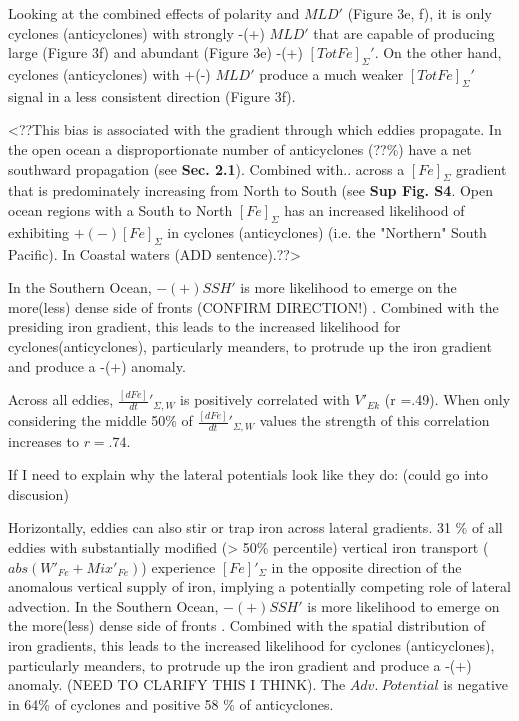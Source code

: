 Looking at the combined effects of polarity and $MLD'$ (Figure 3e, f), it is only cyclones (anticyclones) with strongly -(+) $MLD'$ that are capable of producing large (Figure 3f) and abundant (Figure 3e) -(+) $[TotFe]_\Sigma'$. On the other hand, cyclones (anticyclones) with +(-) $MLD'$ produce a much weaker $[TotFe]_\Sigma'$ signal in a less consistent direction (Figure 3f).

<??This bias is associated with the gradient through which eddies propagate. In the open ocean a disproportionate number of anticyclones (??\%) have a net southward propagation (see \textbf{Sec. 2.1}). Combined with.. across a $[Fe]_\Sigma$ gradient that is predominately increasing from North to South (see \textbf{Sup Fig. S4}. Open ocean regions with a South to North $[Fe]_\Sigma$ has an increased likelihood of exhibiting $+(-)[Fe]_\Sigma$ in cyclones (anticyclones) (i.e. the "Northern" South Pacific).  In Coastal waters (ADD sentence).??>

In the Southern Ocean, $-(+)SSH'$ is more likelihood to emerge on the more(less) dense side of fronts (CONFIRM DIRECTION!) \parencite{SongSeasonalvariationcorrelation2018}.  Combined with the presiding iron gradient, this leads to the increased likelihood for cyclones(anticyclones), particularly meanders, to protrude up the iron gradient and produce a -(+) anomaly. 

 
 
 
Across all eddies, $\frac{[dFe]}{dt}'_{\Sigma, W}$ is positively correlated with $V'_{Ek}$ (r =.49). When only considering the middle 50\% of $\frac{[dFe]}{dt}'_{\Sigma, W}$ values the strength of this correlation increases to $r=.74$. 




If I need to explain why the lateral potentials look like they do:
(could go into discusion)

Horizontally, eddies can also stir or trap iron across lateral gradients. 31 \% of all eddies with substantially modified (> 50\% percentile) vertical iron transport ($abs(W'_{Fe}+Mix'_{Fe})$) experience $[Fe]'_\Sigma$ in the opposite direction of the anomalous vertical supply of iron, implying a potentially competing role of lateral advection. In the Southern Ocean, $-(+)SSH'$ is more likelihood to emerge on the more(less) dense side of fronts \parencite{SongSeasonalvariationcorrelation2018}. Combined with the spatial distribution of iron gradients, this leads to the increased likelihood for cyclones (anticyclones), particularly meanders, to protrude up the iron gradient and produce a -(+) anomaly. (NEED TO CLARIFY THIS I THINK). The $Adv. \ Potential$  is negative in 64\% of cyclones and positive 58 \% of anticyclones.  



